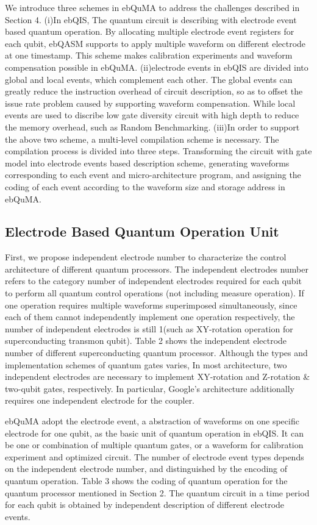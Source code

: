 We introduce three schemes in ebQuMA to address the challenges described in Section 4.
(i)In ebQIS, The quantum circuit is describing with electrode event based quantum operation. 
By allocating multiple electrode event registers for each qubit, ebQASM supports to apply multiple waveform on different electrode at one timestamp. 
This scheme makes calibration experiments and waveform compensation possible in ebQuMA. 
(ii)electrode events in ebQIS are divided into global and local events, which complement each other. 
The global events can greatly reduce the instruction overhead of circuit description, so as to offset the issue rate problem caused by supporting waveform compensation. 
While local events are used to discribe low gate diversity circuit with high depth to reduce the memory overhead, such as Random Benchmarking.
(iii)In order to support the above two scheme, a multi-level compilation scheme is necessary. The compilation process is divided into three steps. 
Transforming the circuit with gate model into electrode events based description scheme, 
generating waveforms corresponding to each event and micro-architecture program, 
and assigning the coding of each event according to the waveform size and storage address in ebQuMA.

\subsection{Electrode Based Quantum Operation Unit}
First, we propose independent electrode number to characterize the control architecture of different quantum processors. 
The independent electrodes number refers to the category number of independent electrodes required for each qubit to perform all quantum control operations (not including measure operation). 
If one operation requires multiple waveforms superimposed simultaneously, 
since each of them cannot independently implement one operation respectively, 
the number of independent electrodes is still 1(such as XY-rotation operation for superconducting transmon qubit). 
Table 2 shows the independent electrode number of different superconducting quantum processor. 
Although the types and implementation schemes of quantum gates varies, 
In most architecture, two independent electrodes are necessary to implement XY-rotation and Z-rotation \& two-qubit gates, respectively. 
In particular, Google's architecture additionally requires one independent electrode for the coupler.

ebQuMA adopt the electrode event, a abstraction of waveforms on one specific electrode for one qubit, as the basic unit of quantum operation in ebQIS. 
It can be one or combination of multiple quantum gates, or a waveform for calibration experiment and optimized circuit. 
The number of electrode event types depends on the independent electrode number, and distinguished by the encoding of quantum operation. 
Table 3 shows the coding of quantum operation for the quantum processor mentioned in Section 2. 
The quantum circuit in a time period for each qubit is obtained by independent description of different electrode events. 


